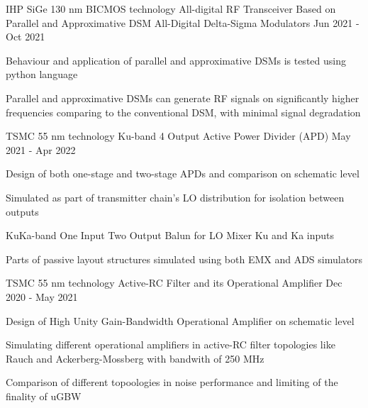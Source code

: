 


\begin{cventries}


\cventry
{IHP SiGe 130 nm BICMOS technology} %
{All-digital RF Transceiver Based on Parallel and Approximative DSM} %
{All-Digital Delta-Sigma Modulators} %
{Jun 2021 - Oct 2021} %
{ %
\begin{cvitems}
\item {Behaviour and application of parallel and approximative DSMs is tested using python language}
\item {Parallel and approximative DSMs can generate RF signals on significantly higher frequencies comparing to the conventional DSM, with minimal signal degradation}
\end{cvitems}
}


\cventry
{TSMC 55 nm technology} %
{Ku-band 4 Output Active Power Divider (APD)} %
{} %
{May 2021 - Apr 2022} %
{ %
\begin{cvitems}
\item {Design of both one-stage and two-stage APDs and comparison on schematic level}
\item {Simulated as part of transmitter chain's LO distribution for isolation between outputs}
\item {KuKa-band One Input Two Output Balun for LO Mixer Ku and Ka inputs}
\item {Parts of passive layout structures simulated using both EMX and ADS simulators}
\end{cvitems}
}


\cventry
{TSMC 55 nm technology} %
{Active-RC Filter and its Operational Amplifier} %
{} %
{Dec 2020 - May 2021} %
{ %
\begin{cvitems}
\item {Design of High Unity Gain-Bandwidth Operational Amplifier on schematic level}
\item {Simulating different operational amplifiers in active-RC filter topologies like Rauch and Ackerberg-Mossberg with bandwith of 250 MHz}
\item {Comparison of different topoologies in noise performance and limiting of the finality of uGBW}
\end{cvitems} 
}


\end{cventries}
